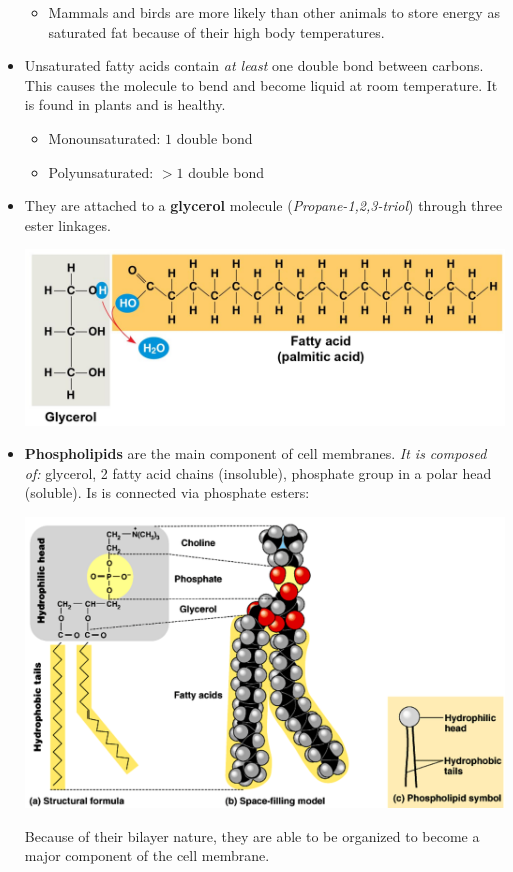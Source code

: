 \documentclass[letterpaper]{article}
\numberwithin{equation}{section}
\theoremstyle{classic}
\begin{document}
\begin{itemize}
    \begin{itemize}
        \item Mammals and birds are more likely than other animals to store energy as saturated fat because of their high body temperatures.
    \end{itemize}
    \item Unsaturated fatty acids contain \textit{at least} one double bond between carbons. This causes the molecule to bend and become liquid at room temperature. It is found in plants and is healthy.
    \begin{multicols}{2}
    \begin{itemize}
        \item Monounsaturated: $1$ double bond
        \item Polyunsaturated: $>1$ double bond
    \end{itemize}
    \end{multicols}
    \item They are attached to a \textbf{glycerol} molecule (\textit{Propane-1,2,3-triol}) through three ester linkages.
    \begin{center}\includegraphics[width=0.6\linewidth]{A6.PNG}\end{center}
    \item \textbf{Phospholipids} are the main component of cell membranes. \textit{It is composed of:} glycerol, 2 fatty acid chains (insoluble), phosphate group in a polar head (soluble). Is is connected via phosphate esters:
    \begin{center}\includegraphics[width=0.6\linewidth]{A7.PNG}\end{center}
    Because of their bilayer nature, they are able to be organized to become a major component of the cell membrane.

\end{itemize}
\end{document}
